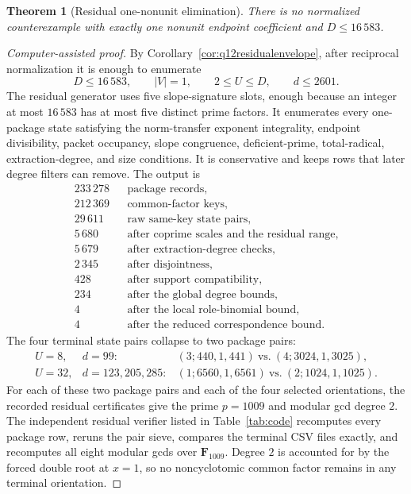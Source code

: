 \documentclass[11pt]{article}
\numberwithin{equation}{section}
\newtheorem{theorem}{Theorem}[section]
\theoremstyle{definition}
\begin{document}
\begin{theorem}[Residual one-nonunit elimination]
\label{thm:onenonunitresidualelimination}
There is no normalized counterexample with exactly one nonunit endpoint
coefficient and \(D\leq16\,583\).
\end{theorem}

\begin{proof}[Computer-assisted proof]
By Corollary~\ref{cor:q12residualenvelope}, after reciprocal normalization it
is enough to enumerate
\[
 D\leq16\,583,\qquad |V|=1,\qquad 2\leq U\leq D,\qquad d\leq2601.
\]
The residual generator uses five slope-signature slots, enough because an
integer at most \(16\,583\) has at most five distinct prime factors.  It
enumerates every one-package state satisfying the norm-transfer exponent
integrality, endpoint divisibility, packet occupancy, slope congruence,
deficient-prime, total-radical, extraction-degree, and size conditions.  It
is conservative and keeps rows that later degree filters can remove.  The
output is
\[
\begin{array}{rcl}
233\,278 && \text{package records},\\
212\,369 && \text{common-factor keys},\\
 29\,611 && \text{raw same-key state pairs},\\
  5\,680 && \text{after coprime scales and the residual range},\\
  5\,679 && \text{after extraction-degree checks},\\
  2\,345 && \text{after disjointness},\\
    428 && \text{after support compatibility},\\
    234 && \text{after the global degree bounds},\\
      4 && \text{after the local role-binomial bound},\\
      4 && \text{after the reduced correspondence bound}.
\end{array}
\]
The four terminal state pairs collapse to two package pairs:
\[
\begin{array}{ccl}
U=8,  & d=99:  &(3;440,1,441)\ \text{vs.}\ (4;3024,1,3025),\\
U=32, & d=123,205,285: &(1;6560,1,6561)\ \text{vs.}\ (2;1024,1,1025).
\end{array}
\]
For each of these two package pairs and each of the four selected
orientations, the recorded residual certificates give the prime \(p=1009\)
and modular gcd degree \(2\).  The independent residual verifier listed in
Table~\ref{tab:code} recomputes every package row, reruns the pair sieve,
compares the terminal CSV files exactly, and recomputes all eight modular
gcds over \(\mathbf F_{1009}\).  Degree \(2\) is accounted for by the forced
double root at \(x=1\), so no noncyclotomic common factor remains in any
terminal orientation.
\end{proof}
\end{document}
